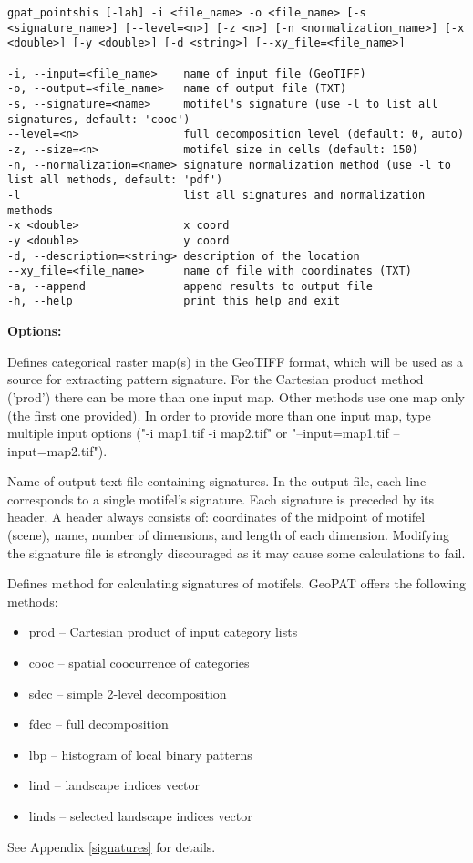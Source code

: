 \begin{minipage}{\linewidth}
\begin{lstlisting}
gpat_pointshis [-lah] -i <file_name> -o <file_name> [-s <signature_name>] [--level=<n>] [-z <n>] [-n <normalization_name>] [-x <double>] [-y <double>] [-d <string>] [--xy_file=<file_name>]

-i, --input=<file_name>    name of input file (GeoTIFF)
-o, --output=<file_name>   name of output file (TXT)
-s, --signature=<name>     motifel's signature (use -l to list all signatures, default: 'cooc')
--level=<n>                full decomposition level (default: 0, auto)
-z, --size=<n>             motifel size in cells (default: 150)
-n, --normalization=<name> signature normalization method (use -l to list all methods, default: 'pdf')
-l                         list all signatures and normalization methods
-x <double>                x coord
-y <double>                y coord
-d, --description=<string> description of the location
--xy_file=<file_name>      name of file with coordinates (TXT)
-a, --append               append results to output file
-h, --help                 print this help and exit
\end{lstlisting}
\end{minipage}

{\bf Options:}


Defines categorical raster map(s) in the GeoTIFF format, which will be used as a source for extracting pattern signature.
For the Cartesian product method ('prod') there can be more than one input map. 
Other methods use one map only (the first one provided). 
In order to provide more than one input map, type multiple input options ("-i map1.tif -i map2.tif" or "--input=map1.tif --input=map2.tif").


Name of output text file containing signatures. 
In the output file, each line corresponds to a single motifel's signature. 
Each signature is preceded by its header.
A header always consists of: coordinates of the midpoint of motifel (scene), name, number of dimensions, and length of each dimension. 
Modifying the signature file is strongly discouraged as it may cause some calculations to fail.


Defines method for calculating signatures of motifels.
GeoPAT offers the following methods: 
\begin{itemize}
	\item prod -- Cartesian product of input category lists
	\item cooc -- spatial coocurrence of categories
	\item sdec -- simple 2-level decomposition
	\item fdec -- full decomposition
	\item lbp -- histogram of local binary patterns
	\item lind -- landscape indices vector
	\item linds -- selected landscape indices vector
\end{itemize}
See Appendix \ref{signatures} for details.

